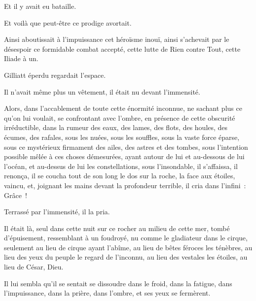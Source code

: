 \documentclass[french,twoside]{book} %
\begin{document}
Et il y avait eu bataille.\par
Et voilà que peut-être ce prodige avortait.\par
Ainsi aboutissait à l’impuissance cet héroïsme inouï, ainsi s’achevait par le désespoir ce formidable combat accepté, cette lutte de Rien contre Tout, cette Iliade à un.\par
Gilliatt éperdu regardait l’espace.\par
Il n’avait même plus un vêtement, il était nu devant l’immensité.\par
Alors, dans l’accablement de toute cette énormité inconnue, ne sachant plus ce qu’on lui voulait, se confrontant avec l’ombre, en présence de cette obscurité irréductible, dans la rumeur des eaux, des lames, des flots, des houles, des écumes, des rafales, sous les nuées, sous les souffles, sous la vaste force éparse, sous ce mystérieux firmament des ailes, des astres et des tombes, sous l’intention possible mêlée à ces choses démesurées, ayant autour de lui et au-dessous de lui l’océan, et au-dessus de lui les constellations, sous l’insondable, il s’affaissa, il renonça, il se coucha tout de son long le dos sur la roche, la face aux étoiles, vaincu, et, joignant les mains devant la profondeur terrible, il cria dans l’infini : Grâce !\par
Terrassé par l’immensité, il la pria.\par
 Il était là, seul dans cette nuit sur ce rocher au milieu de cette mer, tombé d’épuisement, ressemblant à un foudroyé, nu comme le gladiateur dans le cirque, seulement au lieu de cirque ayant l’abîme, au lieu de bêtes féroces les ténèbres, au lieu des yeux du peuple le regard de l’inconnu, au lieu des vestales les étoiles, au lieu de César, Dieu.\par
Il lui sembla qu’il se sentait se dissoudre dans le froid, dans la fatigue, dans l’impuissance, dans la prière, dans l’ombre, et ses yeux se fermèrent.
\end{document}
